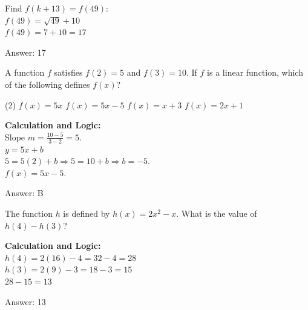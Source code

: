 \documentclass[11pt,paper=a4,answers]{exam}
\begin{document}
\begin{questions}
\begin{solution}
\vspace{10pt}

Find $f(k+13) = f(49)$: \\
$f(49) = \sqrt{49} + 10$ \\
$f(49) = 7 + 10 = 17$

\vspace{25pt}

Answer: \colorbox{yellow!100}{17}
\end{solution}

\vspace{40pt}

\question
A function $f$ satisfies $f(2) = 5$ and $f(3) = 10$. If $f$ is a linear function, which of the following defines $f(x)$?
\begin{tasks}(2)
    \task $f(x) = 5x$
    \task $f(x) = 5x - 5$
    \task $f(x) = x + 3$
    \task $f(x) = 2x + 1$
\end{tasks}

\begin{solution}
\textbf{Calculation and Logic:} \\
Slope $m = \frac{10-5}{3-2} = 5$. \\
$y = 5x + b$ \\
$5 = 5(2) + b \Rightarrow 5 = 10 + b \Rightarrow b = -5$. \\
$f(x) = 5x - 5$.

\vspace{25pt}

Answer: \colorbox{yellow!100}{B}
\end{solution}

\vspace{40pt}

\question
The function $h$ is defined by $h(x) = 2x^2 - x$. What is the value of $h(4) - h(3)$?

\begin{solution}
\textbf{Calculation and Logic:} \\
$h(4) = 2(16) - 4 = 32 - 4 = 28$ \\
$h(3) = 2(9) - 3 = 18 - 3 = 15$ \\
$28 - 15 = 13$

\vspace{25pt}

Answer: \colorbox{yellow!100}{13}
\end{solution}


\end{questions}
\end{document}
